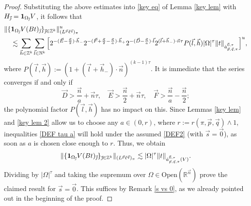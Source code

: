 \documentclass[11pt, reqno]{amsart}
\theoremstyle{definition}
\theoremstyle{remark}
\numberwithin{equation}{section}
\newcommand{\vD}{\vec D}
\newcommand{\vE}{\vec E}
\newcommand{\vF}{\vec F}
\newcommand{\N}{\mathbb N}
\newcommand{\R}{\mathbb R}
\newcommand{\Z}{\mathbb Z}
\newcommand{\vnull}{\vec 0}
\newcommand{\vh}{\vec h}
\newcommand{\vj}{\vec{\textit{\j}}}
\newcommand{\vn}{\vec n}
\newcommand{\vl}{\vec l}
\newcommand{\vp}{\vec p}
\newcommand{\vq}{\vec q}
\newcommand{\vs}{\vec s}
\newcommand{\antau}{\dot a^{\vnull,\tau}_{\vp,\vq,\pi}}
\newcommand{\one}{\mathbf{1}}
\newcommand{\abs}[1]{|#1|}
\newcommand{\Norm}[2]{\|#1\|_{#2}}
\newcommand{\Open}{\mathrm{Open}}
\begin{document}
\begin{proof}
Substituting the above estimates into \eqref{key eq} of Lemma \ref{key lem} with $H_{\vj}=\one_{\Omega_{\vj}}V$, it follows that
\begin{align*}
& \Norm{\{\one_{\Omega_{\vj}}V(Bt)_{\vj}\}_{\vj\in\Z^k}}{(L^{\vp}\ell^{\vq})_\pi}^u \\
&\quad \lesssim \sum_{\vh\in\Z^k}\sum_{\vl\in\N^k}
\Big[ 2^{-(\vE-\frac{\vn}{2})\cdot\vh_-}2^{-(\vF+\frac{\vn}{2}-\frac{\vn}{a})\cdot\vh_+}
2^{-(\vD-\frac{\vn}{a})\cdot\vl}
2^{(\vl+\vh_-)\cdot\vn\tau}P(\vl,\vh)
\abs{\Omega}^{\tau}\Norm{t}{\antau}  \Big]^u,
\end{align*}
where $P(\vl,\vh):=(1+(\vl+\vh_-)\cdot\vn)^{(k-1)\tau}$. It is immediate that the series converges if and only if
\begin{equation}\label{DEF tau a}
\vD>\frac{\vn}{a}+\vn\tau,\quad
\vE>\frac{\vn}{2}+\vn\tau,\quad
\vF>\frac{\vn}{a}-\frac{\vn}{2};
\end{equation}
the polynomial factor $P(\vl,\vh)$ has no impact on this. Since Lemmas \ref{key lem} and \ref{key lem 2} allow us to choose any $a\in(0,r)$, where $r:=r(\pi,\vp,\vq)\wedge 1$, inequalities \eqref{DEF tau a} will hold under the assumed \eqref{DEF2} (with $\vs=\vnull$), as soon as $a$ is chosen close enough to $r$. Thus, we obtain
\begin{equation*}
\Norm{\{\one_{\Omega_{\vj}}V(Bt)_{\vj}\}_{\vj\in\Z^k}}{(L^{\vp}\ell^{\vq})_\pi}
\lesssim\abs{\Omega}^{\tau}\Norm{t}{\antau(V)}.
\end{equation*}
Dividing by $\abs{\Omega}^{\tau}$ and taking the supremum over $\Omega\in\Open(\R^{\vn})$ prove the claimed result for $\vs=\vnull$. This suffices by Remark \ref{s vs 0}, as we already pointed out in the beginning of the proof.
\end{proof}
\end{document}
